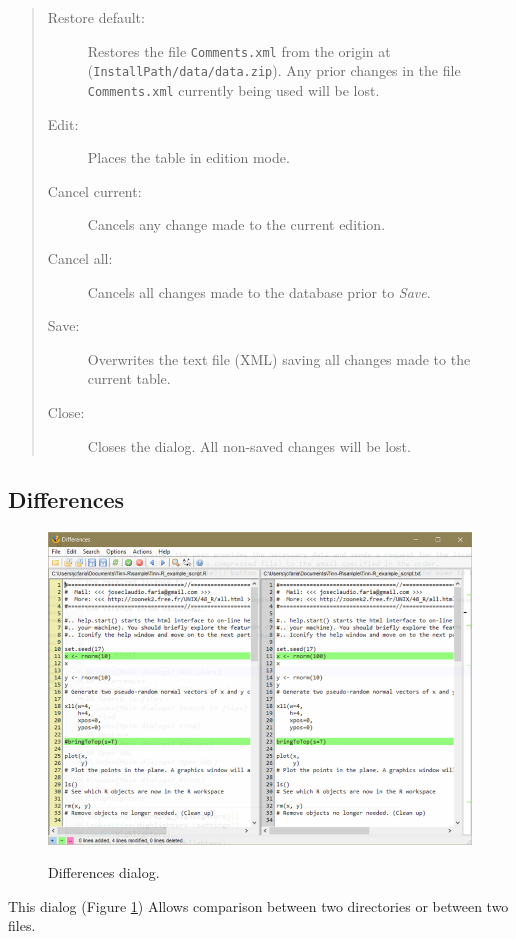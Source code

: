 \begin{quote}
  \begin{footnotesize}
    \begin{description}
      \item[Restore default:]
        Restores the file \texttt{Comments.xml} from the origin at
        (\texttt{InstallPath/data/data.zip}). Any prior changes in the
        file \texttt{Comments.xml} currently being used will be lost.
      \item[Edit:]
        Places the table in edition mode.
      \item[Cancel current:]
        Cancels any change made to the current edition.
      \item[Cancel all:]
        Cancels all changes made to the database prior to \textit{Save}.
      \item[Save:]
        Overwrites the text file (XML) saving all changes made to the current table.
      \item[Close:]
        Closes the dialog. All non-saved changes will be lost.
    \end{description}
  \end{footnotesize}
\end{quote}


\hypertarget{dlg_differences}{}
\subsection{Differences}

\begin{figure}[H]
  \includegraphics[scale=0.80]{./res/dlg_differences.png} \\
  \caption{Differences dialog.}
  \label{fig:dlg_differences}
\end{figure}
This dialog
(Figure \ref{fig:dlg_differences})
Allows comparison between two directories or between two files.

